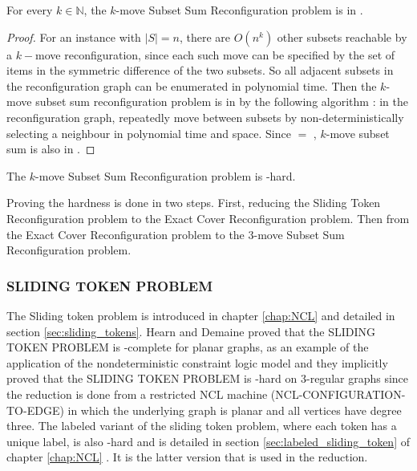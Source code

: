 \begin{lemma}For every $k \in \mathbb{N}$, the $k$-move Subset Sum Reconfiguration problem is in \PSPACE. \end{lemma} 
\begin{proof}
For an instance with $|S| = n$, there are $O(n^{k})$ other subsets reachable by a $k-$move reconfiguration, since each such move can be specified by the set of items in the
symmetric difference of the two subsets. So all adjacent subsets in the reconfiguration graph can be enumerated in polynomial time.
Then the $k$-move subset sum reconfiguration  problem is in \NPSPACE by the following algorithm : in the reconfiguration graph, repeatedly move between subsets by
non-deterministically selecting a neighbour in polynomial time and space. Since \NPSPACE $=$ \PSPACE, $k$-move subset sum is also in \PSPACE.
\end{proof}

\begin{lemma}The $k$-move Subset Sum Reconfiguration problem is \PSPACE-hard. \end{lemma}
Proving the hardness is done in two steps. First, reducing the Sliding Token Reconfiguration problem to the Exact Cover Reconfiguration problem.
Then from the Exact Cover Reconfiguration problem to the $3$-move Subset Sum Reconfiguration problem.

\subsubsection{SLIDING TOKEN PROBLEM}
The Sliding token problem is introduced in chapter \ref{chap:NCL} and detailed in section \ref{sec:sliding_tokens}. Hearn and Demaine proved that the
SLIDING TOKEN PROBLEM is \PSPACE-complete for planar graphs, as an example of the application of the nondeterministic constraint logic
model and they implicitly proved that the SLIDING TOKEN PROBLEM is \PSPACE-hard on $3$-regular graphs since the reduction is done from a restricted NCL machine
(NCL-CONFIGURATION-TO-EDGE) in which the underlying graph is planar and all vertices have degree three. The labeled variant of the sliding token problem, where
each token has a unique label, is also \PSPACE-hard and is detailed in section \ref{sec:labeled_sliding_token} of chapter \ref{chap:NCL} . It is the latter version
that is used in the reduction.

